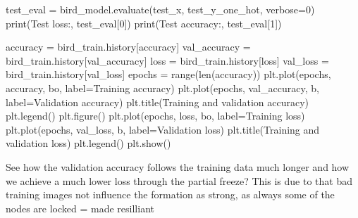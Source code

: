\documentclass[
  letterpaper,
  DIV=11,
  numbers=noendperiod]{scrartcl}
\newenvironment{Shaded}{\begin{snugshade}}{\end{snugshade}}
\newcommand{\BuiltInTok}[1]{\textcolor[rgb]{0.00,0.23,0.31}{#1}}
\newcommand{\DecValTok}[1]{\textcolor[rgb]{0.68,0.00,0.00}{#1}}
\newcommand{\NormalTok}[1]{\textcolor[rgb]{0.00,0.23,0.31}{#1}}
\newcommand{\OperatorTok}[1]{\textcolor[rgb]{0.37,0.37,0.37}{#1}}
\newcommand{\StringTok}[1]{\textcolor[rgb]{0.13,0.47,0.30}{#1}}
\begin{document}
\begin{Shaded}
\begin{Highlighting}[]
\NormalTok{test\_eval }\OperatorTok{=}\NormalTok{ bird\_model.evaluate(test\_x, test\_y\_one\_hot, verbose}\OperatorTok{=}\DecValTok{0}\NormalTok{)}
\BuiltInTok{print}\NormalTok{(}\StringTok{\textquotesingle{}Test loss:\textquotesingle{}}\NormalTok{, test\_eval[}\DecValTok{0}\NormalTok{])}
\BuiltInTok{print}\NormalTok{(}\StringTok{\textquotesingle{}Test accuracy:\textquotesingle{}}\NormalTok{, test\_eval[}\DecValTok{1}\NormalTok{])}

\NormalTok{accuracy }\OperatorTok{=}\NormalTok{ bird\_train.history[}\StringTok{\textquotesingle{}accuracy\textquotesingle{}}\NormalTok{]}
\NormalTok{val\_accuracy }\OperatorTok{=}\NormalTok{ bird\_train.history[}\StringTok{\textquotesingle{}val\_accuracy\textquotesingle{}}\NormalTok{]}
\NormalTok{loss }\OperatorTok{=}\NormalTok{ bird\_train.history[}\StringTok{\textquotesingle{}loss\textquotesingle{}}\NormalTok{]}
\NormalTok{val\_loss }\OperatorTok{=}\NormalTok{ bird\_train.history[}\StringTok{\textquotesingle{}val\_loss\textquotesingle{}}\NormalTok{]}
\NormalTok{epochs }\OperatorTok{=} \BuiltInTok{range}\NormalTok{(}\BuiltInTok{len}\NormalTok{(accuracy))}
\NormalTok{plt.plot(epochs, accuracy, }\StringTok{\textquotesingle{}bo\textquotesingle{}}\NormalTok{, label}\OperatorTok{=}\StringTok{\textquotesingle{}Training accuracy\textquotesingle{}}\NormalTok{)}
\NormalTok{plt.plot(epochs, val\_accuracy, }\StringTok{\textquotesingle{}b\textquotesingle{}}\NormalTok{, label}\OperatorTok{=}\StringTok{\textquotesingle{}Validation accuracy\textquotesingle{}}\NormalTok{)}
\NormalTok{plt.title(}\StringTok{\textquotesingle{}Training and validation accuracy\textquotesingle{}}\NormalTok{)}
\NormalTok{plt.legend()}
\NormalTok{plt.figure()}
\NormalTok{plt.plot(epochs, loss, }\StringTok{\textquotesingle{}bo\textquotesingle{}}\NormalTok{, label}\OperatorTok{=}\StringTok{\textquotesingle{}Training loss\textquotesingle{}}\NormalTok{)}
\NormalTok{plt.plot(epochs, val\_loss, }\StringTok{\textquotesingle{}b\textquotesingle{}}\NormalTok{, label}\OperatorTok{=}\StringTok{\textquotesingle{}Validation loss\textquotesingle{}}\NormalTok{)}
\NormalTok{plt.title(}\StringTok{\textquotesingle{}Training and validation loss\textquotesingle{}}\NormalTok{)}
\NormalTok{plt.legend()}
\NormalTok{plt.show()}
\end{Highlighting}
\end{Shaded}

See how the validation accuracy follows the training data much longer
and how we achieve a much lower loss through the partial freeze? This is
due to that bad training images not influence the formation as strong,
as always some of the nodes are locked = made resilliant
\end{document}
